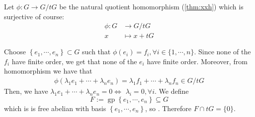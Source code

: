 \documentclass{article}
\newcommand{\gp}{\operatorname{gp}}
\begin{document}
Let $\phi: G \rightarrow G / t G$ be the natural quotient homomorphism (\cref{thm:xxh}) which is surjective of course:
\begin{align*}
    \phi: G &\rightarrow G / t G \\
    x &\mapsto x+tG
\end{align*}

Choose $\left\{e_{1}, \cdots, e_{n}\right\} \subset G$ such that $\phi\left(e_{i}\right)=f_{i}, \forall i \in\{1, \cdots, n\} .$ Since none of the $f_{i}$ have finite order, we get that none of the $e_{i}$ have finite order. Moreover, from homomorphism we have that
\begin{align*}
\phi\left(\lambda_{1} e_{1}+\cdots+\lambda_{n} e_{n}\right)=\lambda_{1} f_{1}+\cdots+\lambda_{n} f_{n} \in G / t G
\end{align*}
Then, we have $\lambda_{1} e_{1}+\cdots+\lambda_{n} e_{n}=0 \Longleftrightarrow$
$\lambda_{i}=0, \forall i$. We define
$$F:=\gp\left\{e_{1}, \cdots, e_{n}\right\} \subseteq G$$
which is is free abelian with basis $\left\{e_{1}, \cdots, e_{n}\right\}$, so . Therefore $F \cap t G=\{0\}$. 
\end{document}
